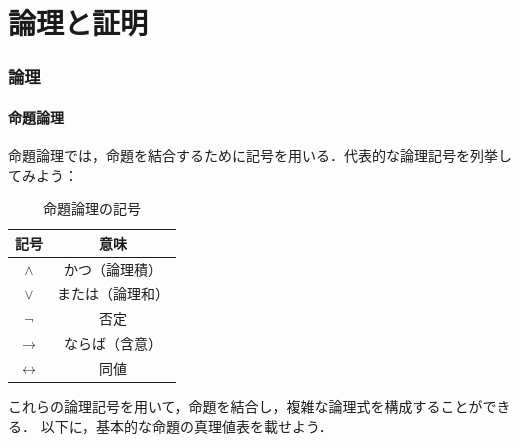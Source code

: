 \part{論理と証明}

\begin{abstract}
この章では，数学の議論を支える「論理」と「証明」について整理する．まず命題論理の記号と真理値表を確認し，交換律・分配律・ド・モルガンの法則などの基本法則を述べる．次に，変数を含む文を扱う述語論理を導入し，全称命題・存在命題および量化子の入れ子について注意する．そのうえで，証明とはなにかを確認し，反例による反証や，帰納法・背理法・直接証明といったさまざまな証明法を具体例とともに見ていこう．
\end{abstract}

\section{論理}
\subsection{命題論理}

命題論理では，命題を結合するために記号を用いる．代表的な論理記号を列挙してみよう：

\begin{table}[ht]
  \centering
  \caption{命題論理の記号}
  \begin{tabular}{c|c}
    \hline
    記号                & 意味                       \\
    \hline
    $\land$           & かつ（論理積\index{ろんりせき@論理積}） \\
    $\lor$            & または（論理和\index{ろんりわ@論理和}） \\
    $\lnot$           & 否定\index{ひてい@否定}         \\
    $\to$             & ならば（含意\index{がんい@含意}）    \\
    $\leftrightarrow$ & 同値 \index{どうち@同値} \\
    \hline
  \end{tabular}
\end{table}

これらの論理記号を用いて，命題を結合し，複雑な論理式を構成することができる．
以下に，基本的な命題の真理値表を載せよう．

